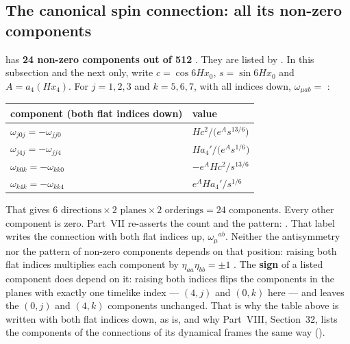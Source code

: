 \subsection{The canonical spin connection: all its non-zero components}
\label{csc:components}\label{sec:9.6}

 has \textbf{24 non-zero components out of 512} .
They are listed by . In this subsection and the
next only, write $c=\cos 6Hx_0$, $s=\sin 6Hx_0$ and $A=a_4(Hx_4)$. For $j=1,2,3$ and $k=5,6,7$,
with all indices down,
$\omega_{\mu ab}=$ :

\begin{center}
\begin{tabular}{@{}ll@{}}
\toprule
component (both flat indices down) & value \\
\midrule
$\omega_{j0j}=-\omega_{jj0}$ & $H c^2\big/\bigl(e^{A}s^{13/6}\bigr)$ \\
$\omega_{j4j}=-\omega_{jj4}$ & $H a_4'\big/\bigl(e^{A}s^{1/6}\bigr)$ \\
$\omega_{k0k}=-\omega_{kk0}$ & $-e^{A}H c^2\big/s^{13/6}$ \\
$\omega_{k4k}=-\omega_{kk4}$ & $e^{A}H a_4'\big/s^{1/6}$ \\
\bottomrule
\end{tabular}
\end{center}

\noindent That gives $6\text{ directions}\times2\text{ planes}\times2\text{ orderings}=24$
components. Every other component is zero.
Part~VII re-asserts the count and the pattern:  .
That label writes the connection with both flat indices up, $\omega_\mu{}^{ab}$. Neither the
antisymmetry nor the pattern of non-zero components depends on that position: raising both flat
indices multiplies each component by $\eta_{aa}\eta_{bb}=\pm1$ \cfderived. The \textbf{sign} of a
listed component does depend on it: raising both indices flips the components in the planes with
exactly one timelike index --- $(4,j)$ and $(0,k)$ here --- and leaves the $(0,j)$ and $(4,k)$
components unchanged. That is why the table above is written with both flat indices down, as
 is, and why Part~VIII, Section~32, lists the components of the connections of
its dynamical frames the same way ().

